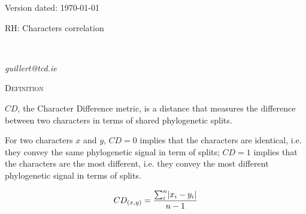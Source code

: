\documentclass[12pt,letterpaper]{article}
\DeclarePairedDelimiter\abs{\lvert}{\rvert}%
\renewcommand{\section}[1]{%
\bigskip
\begin{center}
\begin{Large}
\normalfont\scshape #1
\medskip
\end{Large}
\end{center}}
\begin{document}
\begin{flushright}
Version dated: \today
\end{flushright}
\bigskip
\noindent RH: Characters correlation

\bigskip
\medskip
\begin{center}


\bigskip


\bigskip

\\

\end{center}
\medskip
{} \textit{guillert@tcd.ie}\\ 
\vspace{1in}

\newpage

\section{Definition}

$CD$, the Character Difference metric, is a distance that measures the difference between two characters in terms of shared phylogenetic splits.

For two characters $x$ and $y$, $CD=0$ implies that the characters are identical, i.e. they convey the same phylogenetic signal in term of splits; $CD=1$ implies that the characters are the most different, i.e. they convey the most different phylogenetic signal in terms of splits.

\begin{equation}
    CD_{(x,y)} = \frac{\sum_{i}^{n}\abs{x_{i} - y_{i}}}{n-1}
\end{equation}
\end{document}
